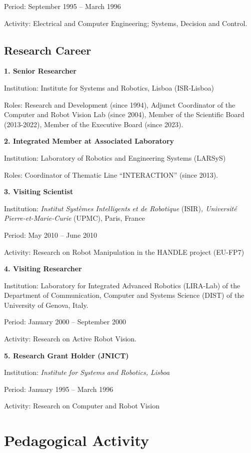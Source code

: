 \documentclass[
]{article}
\begin{document}
Period: September 1995 -- March 1996

Activity: Electrical and Computer Engineering; Systems, Decision and
Control.

\subsection{Research Career}\label{research-career}

\textbf{1. Senior Researcher}

Institution: Institute for Systems and Robotics, Lisboa (ISR-Lisboa)

Roles: Research and Development (since 1994), Adjunct Coordinator of the
Computer and Robot Vision Lab (since 2004), Member of the Scientific
Board (2013-2022), Member of the Executive Board (since 2023).

\textbf{2. Integrated Member at Associated Laboratory}

Institution: Laboratory of Robotics and Engineering Systems (LARSyS)

Roles: Coordinator of Thematic Line ``INTERACTION'' (since 2013).

\textbf{3. Visiting Scientist}

Institution: \emph{Institut Systèmes Intelligents et de Robotique}
(ISIR)\emph{, Université Pierre-et-Marie-Curie} (UPMC), Paris, France

Period: May 2010 -- June 2010

Activity: Research on Robot Manipulation in the HANDLE project (EU-FP7)

\textbf{4. Visiting Researcher}

Institution: Laboratory for Integrated Advanced Robotics (LIRA-Lab) of
the Department of Communication, Computer and Systems Science (DIST) of
the University of Genova, Italy.

Period: January 2000 -- September 2000

Activity: Research on Active Robot Vision.

\textbf{5. Research Grant Holder (JNICT)}

Institution: \emph{Institute for Systems and Robotics, Lisboa}

Period: January 1995 -- March 1996

Activity: Research on Computer and Robot Vision

\section{Pedagogical Activity}\label{pedagogical-activity}
\end{document}
